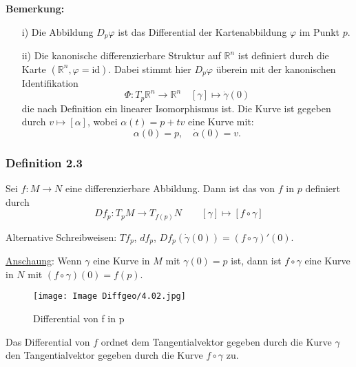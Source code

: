 \documentclass[fleqn, 12pt, letterpaper]{article}
\begin{document}
\textbf{Bemerkung:}
\begin{itemize}
    \item[i)] Die Abbildung \( D_p\varphi \) ist das Differential der Kartenabbildung \(\varphi\) im Punkt \( p \).
    
    \item[ii)] Die kanonische differenzierbare Struktur auf \(\mathbb{R}^n\) ist definiert durch die Karte \((\mathbb{R}^n, \varphi = \mathrm{id})\). Dabei stimmt hier \( D_p{\varphi} \) überein mit der kanonischen Identifikation
    \[
    \Phi: T_p\mathbb{R}^n\rightarrow \mathbb{R}^n \quad [\gamma]\mapsto \dot{\gamma}(0)
    \]
    die nach Definition ein linearer Isomorphismus ist. Die Kurve ist gegeben durch \( v \mapsto [\alpha] \), wobei \( \alpha(t)=p+tv \) eine Kurve mit:
    \[
    \alpha(0) = p , \quad \dot{\alpha}(0) = v .
    \]
\end{itemize}

\subsubsection*{Definition 2.3}
Sei \( f: M \to N \) eine differenzierbare Abbildung. Dann ist das \emph{} von \( f \) in \( p \) definiert durch
\[
Df_p: T_p M \to T_{f(p)} N \qquad [\gamma]\mapsto [f \circ \gamma]
\]

Alternative Schreibweisen: \( Tf_p \), \( df_p \), \(Df_p(\dot{\gamma}(0)) = (f \circ \gamma)'(0).\)

\vspace{0.5cm}

\underline{Anschaung}: Wenn \( \gamma \) eine Kurve in \( M \) mit \( \gamma(0) = p \) ist, dann ist \( f \circ \gamma \) eine Kurve in \( N \) mit \( (f \circ \gamma)(0) = f(p) \).

\begin{figure}[H]
  \centering
  \texttt{[image: Image Diffgeo/4.02.jpg]}
\caption{Differential von f in p}
\end{figure}

Das Differential von \( f \) ordnet dem Tangentialvektor gegeben durch die Kurve \( \gamma \) den Tangentialvektor gegeben durch die Kurve \( f \circ \gamma \) zu.\\
\end{document}
